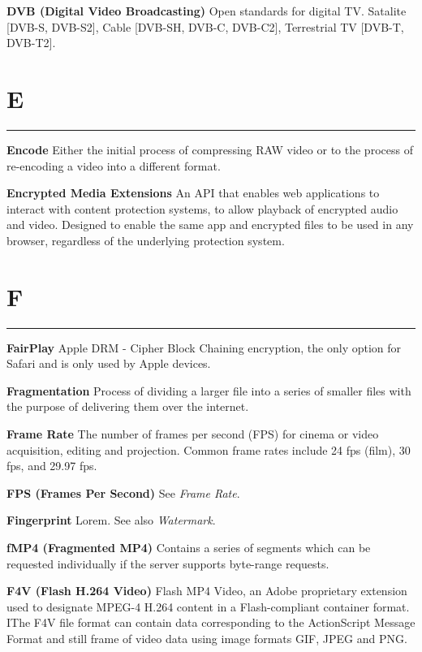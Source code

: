 \smallskip
\textbf{DVB (Digital Video Broadcasting)}
Open standards for digital TV.  Satalite [DVB-S, DVB-S2], Cable [DVB-SH, DVB-C, DVB-C2], Terrestrial TV [DVB-T, DVB-T2].

\section{E}
\hrule

\medskip
\textbf{Encode}
Either the initial process of compressing RAW video or to the process of re-encoding a video into a different format.

\smallskip
\textbf{Encrypted Media Extensions}
An API that enables web applications to interact with content protection systems, to allow playback of encrypted audio and video. Designed to enable the same app and encrypted files to be used in any browser, regardless of the underlying protection system.

\section{F}
\hrule

\medskip
\textbf{FairPlay}
Apple DRM - Cipher Block Chaining encryption, the only option for Safari and is only used by Apple devices.

\smallskip
\textbf{Fragmentation}
Process of dividing a larger file into a series of smaller files with the purpose of delivering them over the internet.

\textbf{Frame Rate}
The number of frames per second (FPS) for cinema or video acquisition, editing and projection. Common frame rates include 24 fps (film), 30 fps, and 29.97 fps.

\textbf{FPS (Frames Per Second)}
See \textit{Frame Rate}.

\smallskip
\textbf{Fingerprint}
Lorem. See also \textit{Watermark}.

\smallskip
\textbf{fMP4 (Fragmented MP4)}
Contains a series of segments which can be requested individually if the server supports byte-range requests.

\smallskip
\textbf{F4V (Flash H.264 Video)}
Flash MP4 Video, an Adobe proprietary extension used to designate MPEG-4 H.264 content in a Flash-compliant container format. IThe F4V file format can contain data corresponding to the ActionScript Message Format and still frame of video data using image formats GIF, JPEG and PNG.

